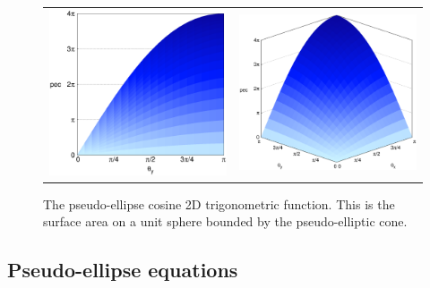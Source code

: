 \begin{figure}
\centering
  \begin{tabular}{@{}cc@{}}
    \includegraphics[width=.5\textwidth,bb=150 150 650 650]{images/pec_y.eps} &
    \includegraphics[width=.5\textwidth,bb=80 80 730 740]{images/pec_diag.eps}
  \end{tabular}
  \caption[Pseudo-ellipse cosine 2D trigonometric function.]{
    The pseudo-ellipse cosine 2D trigonometric function.
    This is the surface area on a unit sphere bounded by the pseudo-elliptic cone.
  }
  \label{fig: pec function}
\end{figure}




\subsection{Pseudo-ellipse equations}

